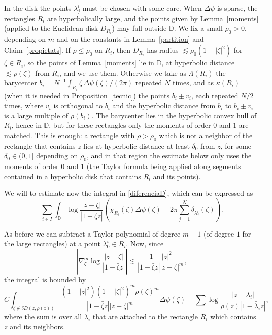 \documentclass[12pt,twoside,final,psamsfonts]{amsart}
\theoremstyle{plain}
\theoremstyle{remark}
\theoremstyle{definition}
\newcommand{\D}{{\mathbb D}}
\begin{document}
In the disk the points $\lambda^i_j$ must be chosen with some care. When
$\Delta\psi$ is sparse, the rectangles $R_i$ are hyperbolically large, and the
points given by Lemma~\ref{moments} (applied to the Euclidean disk $D_{R_i}$)
may fall outside $\D$. We fix a small $\rho_0>0$, depending on $m$ and on the
constants in Lemma~\ref{partition} and Claim~\ref{propietats}. If $\rho\le\rho_0$
on $R_i$, then $D_{R_i}$ has radius $\lesssim\rho_0(1-|\zeta|^2)$ for
$\zeta\in R_i$, so the points of Lemma~\ref{moments} lie in $\D$, at
hyperbolic distance $\lesssim\rho(\zeta)$ from $R_i$, and we use them. Otherwise we
take as $\Lambda(R_i)$ the barycenter
$b_i=N^{-1}\int_{R_i}\zeta\,\Delta\psi(\zeta)/(2\pi)$ repeated $N$ times, and as
$\kappa(R_i)$ (when it is needed in Proposition~\ref{tecnic}) the points
$b_i\pm v_i$, each repeated $N/2$ times, where $v_i$ is orthogonal to $b_i$ and
the hyperbolic distance from $b_i$ to $b_i\pm v_i$ is a large multiple of
$\rho(b_i)$. The barycenter lies in the hyperbolic convex hull of $R_i$, hence
in $\D$, but for these rectangles only the moments of order $0$ and $1$ are
matched. This is enough: a rectangle with $\rho>\rho_0$ which is not a neighbor
of the rectangle that contains $z$ lies at hyperbolic distance at least
$\delta_0$ from $z$, for some $\delta_0\in(0,1]$ depending on $\rho_0$, and in that region the
estimate below only uses the moments of order $0$ and $1$ (the Taylor formula
being applied along segments contained in a hyperbolic disk that contains $R_i$
and its points).

We will to estimate now the integral in \eqref{diferenciaD}, which can be
expressed as
\[
\sum_{i\in I}\int_{\D} \log \frac{|z-\zeta|}{|1-\bar\zeta z|}
\left(\chi_{R_i}(\zeta)\Delta\psi(\zeta)-2\pi\sum_{j=1}^N
\delta_{\lambda_j^i}(\zeta)\right).
\]

As before we can subtract a Taylor polynomial of degree $m-1$
(of degree $1$ for the large rectangles)
at a point $\lambda_0^i\in R_i$. Now, since
\[
\left|\nabla_\zeta^m \log \frac{|z-\zeta|}{|1-\bar\zeta z|}\right|\lesssim
\frac{1-|z|^2}{|1-\bar\zeta z||z-\zeta|^m},
\]
the integral is bounded by
\begin{equation}\label{disc}
C\int_{\zeta\notin\delta D(z,\rho(z))} 
\frac{(1-|z|^2)(1-|\zeta|^2)^m\rho(\zeta)^m}
{|1-\bar\zeta z||z-\zeta|^m}\Delta\psi(\zeta)+\sum
\log\frac{|z-\lambda_i|}{\rho(z)|1-\bar\lambda_i z|},
\end{equation}
where the sum is over all $\lambda_i$ that are attached to the rectangle $R_i$ which
contains $z$ and its neighbors.
\end{document}
